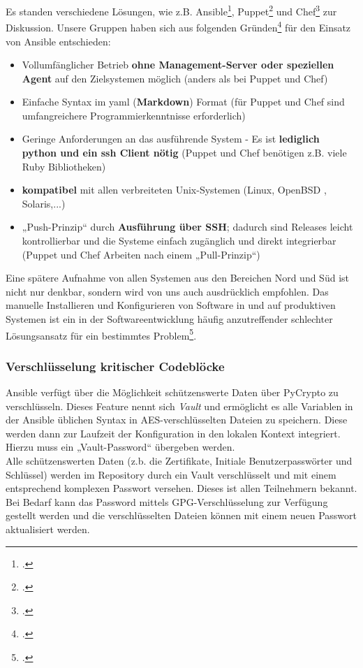 Es standen verschiedene Lösungen, wie z.B. Ansible\footcite{ansible}, Puppet\footcite{puppet} und Chef\footcite{chef} zur Diskussion. Unsere Gruppen haben sich aus folgenden Gründen\footcite{whyAnsible} für den Einsatz von Ansible entschieden:

\begin{itemize}
\item Vollumfänglicher Betrieb \textbf{ohne Management-Server oder speziellen Agent} auf den Zielsystemen möglich (anders als bei Puppet und Chef)
\item Einfache Syntax im yaml (\textbf{Markdown}) Format  
(für Puppet und Chef sind umfangreichere Programmierkenntnisse erforderlich)
\item Geringe Anforderungen an das ausführende System - Es ist \textbf{lediglich python und ein ssh Client nötig} (Puppet und Chef benötigen z.B. viele Ruby Bibliotheken)
\item \textbf{kompatibel} mit allen verbreiteten Unix-Systemen (Linux, OpenBSD , Solaris,...)
\item „Push-Prinzip“ durch \textbf{Ausführung über SSH}; dadurch sind Releases leicht kontrollierbar und die Systeme einfach zugänglich und direkt integrierbar
(Puppet und Chef Arbeiten nach einem „Pull-Prinzip“)
\end{itemize}

Eine spätere Aufnahme von allen Systemen aus den Bereichen Nord und Süd ist nicht nur denkbar, sondern wird von uns auch ausdrücklich empfohlen. Das manuelle Installieren und Konfigurieren von Software in und auf produktiven Systemen ist ein in der Softwareentwicklung häufig anzutreffender schlechter Lösungsansatz für ein bestimmtes Problem\footcite{humble2010continuous}.

\subsubsection{Verschlüsselung kritischer Codeblöcke}
\label{subsubsec:vault}
Ansible verfügt über die Möglichkeit schützenswerte Daten über PyCrypto zu verschlüsseln. Dieses Feature nennt sich \emph{Vault} und ermöglicht es alle Variablen in der Ansible üblichen Syntax in AES-verschlüsselten Dateien zu speichern. Diese werden dann zur Laufzeit der Konfiguration in den lokalen Kontext integriert. Hierzu muss ein „Vault-Password“ übergeben werden. \\

Alle schützenswerten Daten (z.b. die Zertifikate, Initiale Benutzerpasswörter und Schlüssel) werden im Repository durch ein Vault verschlüsselt und mit einem entsprechend komplexen Passwort versehen. Dieses ist allen Teilnehmern bekannt. Bei Bedarf kann das Password mittels GPG-Verschlüsselung zur Verfügung gestellt werden und die verschlüsselten Dateien können mit einem neuen Passwort aktualisiert werden.

